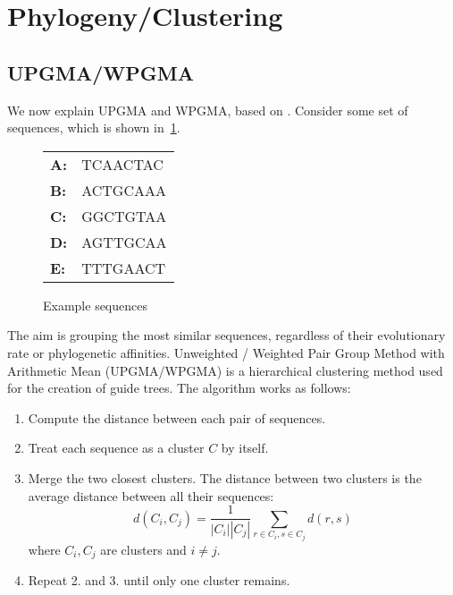 
\section{Phylogeny/Clustering}
\label{sec:clustering}

\subsection{UPGMA/WPGMA}
\label{sec:UPGMA}
We now explain UPGMA and WPGMA, based on \cite{durbin_eddy_krogh_mitchison_1998, DBLP:journals/almob/ApostolicoCDP13}.
Consider some set of sequences, which is shown in~\cref{fig:seq}.
\begin{figure}[H]
  \centering
    \begin{tabular}{ll}
      \textbf{A:} & TCAACTAC \\
      \textbf{B:} & ACTGCAAA \\
      \textbf{C:} & GGCTGTAA \\
      \textbf{D:} & AGTTGCAA \\
      \textbf{E:} & TTTGAACT
    \end{tabular}
  \caption{Example sequences}
  \label{fig:seq}
\end{figure}
The aim is \textcolor{ALUblue}{grouping} the most \textcolor{ALUblue}{similar sequences}, regardless of their evolutionary rate or phylogenetic affinities.
\textcolor{ALUblue}{U}nweighted / \textcolor{ALUblue}{W}eighted \textcolor{ALUblue}{P}air \textcolor{ALUblue}{G}roup \textcolor{ALUblue}{M}ethod with \textcolor{ALUblue}{A}rithmetic Mean (UPGMA/WPGMA)
is a  hierarchical clustering method used for the \textcolor{ALUblue}{creation of guide trees}.
The algorithm works as follows:
\begin{enumerate}
  \item Compute the \textcolor{ALUblue}{distance between each pair of sequences}.
  \item Treat \textcolor{ALUblue}{each sequence} as a \textcolor{ALUblue}{cluster $C$} by itself.
  \item \textcolor{ALUblue}{Merge the two closest clusters}. The distance between two clusters is the \textcolor{ALUred}{average distance between all their sequences}:
  $$d(C_i,C_j) = \frac{1}{|C_i| |C_j|} \sum_{r \in C_i, s\in C_j} d(r,s)$$
  where $C_i, C_j$ are clusters and $i \not= j$.
  \item Repeat 2. and 3. until only one cluster remains.
\end{enumerate}

